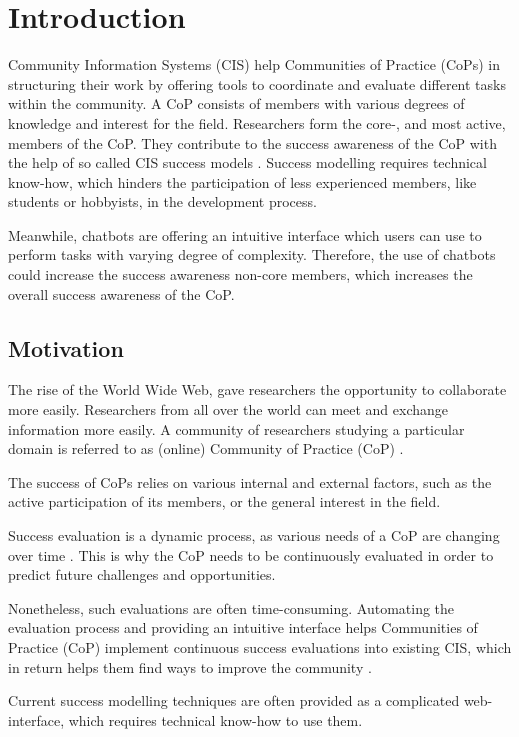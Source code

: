 \chapter{Introduction}
Community Information Systems (CIS) help Communities of Practice (CoPs) in structuring their work by offering tools to coordinate and evaluate different tasks within the community.
A CoP consists of members with various degrees of knowledge and interest for the field.
Researchers form the core-, and most active, members of the CoP.
They contribute to the success awareness of the CoP with the help of so called CIS success models \cite{Klam10c}.
Success modelling requires technical know-how, which hinders the participation of less experienced members, like students or hobbyists, in the development process.

Meanwhile, chatbots are offering an intuitive interface which users can use to perform tasks with varying degree of complexity. 
Therefore, the use of chatbots could increase the success awareness non-core members, which increases the overall success awareness of the CoP.

\section{Motivation}
The rise of the World Wide Web, gave researchers the opportunity to collaborate more easily. Researchers from all over the world can meet and exchange information more easily. A community of researchers studying a particular domain is referred to as (online) Community of Practice (CoP) \cite{Renz08}.

The success of CoPs relies on various internal and external factors, such as the active participation of its members, or the general interest in the field.

Success evaluation is a dynamic process, as various needs of a CoP are changing over time \cite{Renz08,GKJa08}.
This is why the CoP needs to be continuously evaluated in order to predict future challenges and opportunities.

Nonetheless, such evaluations are often time-consuming. Automating the evaluation process and providing an intuitive interface helps Communities of Practice (CoP) implement continuous success evaluations into existing CIS, which in return helps them find ways to improve the community \cite{Renz08}.

Current success modelling techniques are often provided as a complicated web-interface, which requires technical know-how to use them.

